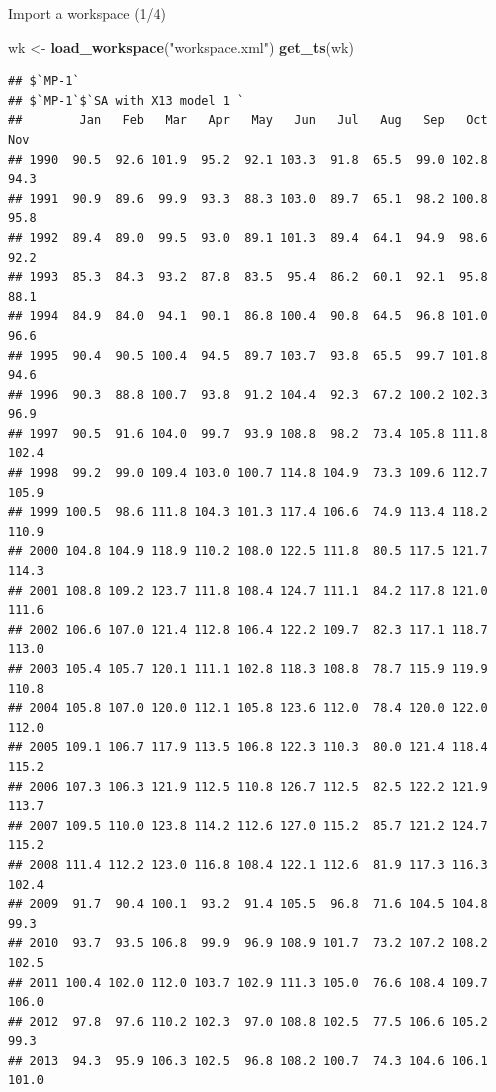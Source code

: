 \documentclass[10pt,xcolor=table,color={dvipsnames,usenames},ignorenonframetext,usepdftitle=false,french]{beamer}
\newenvironment{Shaded}{\begin{snugshade}}{\end{snugshade}}
\newcommand{\KeywordTok}[1]{\textcolor[rgb]{0.13,0.29,0.53}{\textbf{#1}}}
\newcommand{\NormalTok}[1]{#1}
\newcommand{\StringTok}[1]{\textcolor[rgb]{0.31,0.60,0.02}{#1}}
\begin{document}
\begin{frame}[fragile]{Import a workspace (1/4)}
\protect\hypertarget{import-a-workspace-14}{}

\footnotesize

\begin{Shaded}
\begin{Highlighting}[]
\NormalTok{wk <-}\StringTok{ }\KeywordTok{load_workspace}\NormalTok{(}\StringTok{"workspace.xml"}\NormalTok{)}
\KeywordTok{get_ts}\NormalTok{(wk)}
\end{Highlighting}
\end{Shaded}

\begin{verbatim}
## $`MP-1`
## $`MP-1`$`SA with X13 model 1 `
##        Jan   Feb   Mar   Apr   May   Jun   Jul   Aug   Sep   Oct   Nov
## 1990  90.5  92.6 101.9  95.2  92.1 103.3  91.8  65.5  99.0 102.8  94.3
## 1991  90.9  89.6  99.9  93.3  88.3 103.0  89.7  65.1  98.2 100.8  95.8
## 1992  89.4  89.0  99.5  93.0  89.1 101.3  89.4  64.1  94.9  98.6  92.2
## 1993  85.3  84.3  93.2  87.8  83.5  95.4  86.2  60.1  92.1  95.8  88.1
## 1994  84.9  84.0  94.1  90.1  86.8 100.4  90.8  64.5  96.8 101.0  96.6
## 1995  90.4  90.5 100.4  94.5  89.7 103.7  93.8  65.5  99.7 101.8  94.6
## 1996  90.3  88.8 100.7  93.8  91.2 104.4  92.3  67.2 100.2 102.3  96.9
## 1997  90.5  91.6 104.0  99.7  93.9 108.8  98.2  73.4 105.8 111.8 102.4
## 1998  99.2  99.0 109.4 103.0 100.7 114.8 104.9  73.3 109.6 112.7 105.9
## 1999 100.5  98.6 111.8 104.3 101.3 117.4 106.6  74.9 113.4 118.2 110.9
## 2000 104.8 104.9 118.9 110.2 108.0 122.5 111.8  80.5 117.5 121.7 114.3
## 2001 108.8 109.2 123.7 111.8 108.4 124.7 111.1  84.2 117.8 121.0 111.6
## 2002 106.6 107.0 121.4 112.8 106.4 122.2 109.7  82.3 117.1 118.7 113.0
## 2003 105.4 105.7 120.1 111.1 102.8 118.3 108.8  78.7 115.9 119.9 110.8
## 2004 105.8 107.0 120.0 112.1 105.8 123.6 112.0  78.4 120.0 122.0 112.0
## 2005 109.1 106.7 117.9 113.5 106.8 122.3 110.3  80.0 121.4 118.4 115.2
## 2006 107.3 106.3 121.9 112.5 110.8 126.7 112.5  82.5 122.2 121.9 113.7
## 2007 109.5 110.0 123.8 114.2 112.6 127.0 115.2  85.7 121.2 124.7 115.2
## 2008 111.4 112.2 123.0 116.8 108.4 122.1 112.6  81.9 117.3 116.3 102.4
## 2009  91.7  90.4 100.1  93.2  91.4 105.5  96.8  71.6 104.5 104.8  99.3
## 2010  93.7  93.5 106.8  99.9  96.9 108.9 101.7  73.2 107.2 108.2 102.5
## 2011 100.4 102.0 112.0 103.7 102.9 111.3 105.0  76.6 108.4 109.7 106.0
## 2012  97.8  97.6 110.2 102.3  97.0 108.8 102.5  77.5 106.6 105.2  99.3
## 2013  94.3  95.9 106.3 102.5  96.8 108.2 100.7  74.3 104.6 106.1 101.0

\end{verbatim}
\end{frame}
\end{document}

